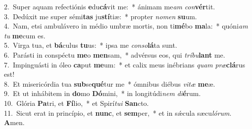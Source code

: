 {2.~}Super aquam refectiónis \textbf{e}du\textbf{cá}vit me:~* ánimam me\textit{am} \textit{con}\textbf{vér}tit.\\
{3.~}Dedúxit me super sémi\textbf{tas} ju\textbf{stí}tiæ:~* propter \textit{no}\textit{men} \textbf{su}um.\\
{4.~}Nam, etsi ambulávero in médio umbræ mortis, non ti\textbf{mé}bo \textbf{ma}la:~* quóni\textit{am} \textit{tu} \textbf{me}cum es.\\
{5.~}Virga tua, et \textbf{bá}culus \textbf{tu}us:~* ipsa me \textit{con}\textit{so}\textbf{lá}ta sunt.\\
{6.~}Parásti in conspéctu \textbf{me}o \textbf{men}sam,~* advérsus eos, qui \textit{trí}\textit{bu}\textbf{lant} me.\\
{7.~}Impinguásti in óleo \textbf{ca}put \textbf{me}um:~* et calix meus inébrians \textit{quam} \textit{præ}\textbf{clá}rus est!\\
{8.~}Et misericórdia tua \textbf{sub}se\textbf{qué}tur me~* ómnibus diébus \textit{vi}\textit{tæ} \textbf{me}æ.\\
{9.~}Et ut inhábitem in \textbf{do}mo \textbf{Dó}mini,~* in longitúdi\textit{nem} \textit{di}\textbf{é}rum.\\
{10.~}Glória \textbf{Pa}tri, et \textbf{Fí}lio,~* et Spirí\textit{tu}\textit{i} \textbf{San}cto.\\
{11.~}Sicut erat in princípio, et \textbf{nunc}, et \textbf{sem}per,~* et in sǽcula sæcu\textit{ló}\textit{rum}. \textbf{A}men.\\

